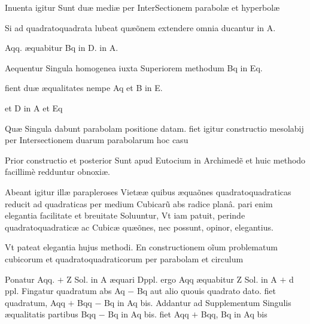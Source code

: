 \documentclass[11pt,a4paper]{article}
\begin{document}
Inuenta igitur Sunt duæ mediæ per InterSectionem parabolæ et hyperbolæ

Si ad quadratoquadrata lubeat quæõnem extendere omnia ducantur in A.

Aqq. æquabitur Bq in D. in A.

Aequentur Singula homogenea iuxta Superiorem methodum Bq in Eq.

fient duæ æqualitates nempe Aq et B in E.

et D in A et Eq

Quæ Singula dabunt parabolam positione datam. fiet igitur constructio mesolabij per Intersectionem duarum parabolarum hoc casu

Prior constructio et posterior Sunt apud Eutocium in Archimedẽ et huic methodo facillimè redduntur obnoxiæ.

Abeant igitur illæ parapleroses Vietææ quibus æquaõnes quadratoquadraticas reducit ad quadraticas per medium Cubicarũ abs radice planâ. pari enim elegantia facilitate et breuitate Soluuntur, Vt iam patuit, perinde quadratoquadraticæ ac Cubicæ quæõnes, nec possunt, opinor, elegantius.

Vt pateat elegantia hujus methodi. En constructionem oĩum problematum cubicorum et quadratoquadraticorum per parabolam et circulum

Ponatur Aqq. $+$ Z Sol. in A æquari Dppl. ergo Aqq æquabitur Z Sol. in A $+$ d ppl. Fingatur quadratum abs Aq $-$ Bq aut alio quouis quadrato dato. fiet quadratum, Aqq $+$ Bqq $-$ Bq in Aq bis. Addantur ad Supplementum Singulis æqualitatis partibus Bqq $-$ Bq in Aq bis. fiet Aqq $+$ Bqq, Bq in Aq bis

\end{document}
